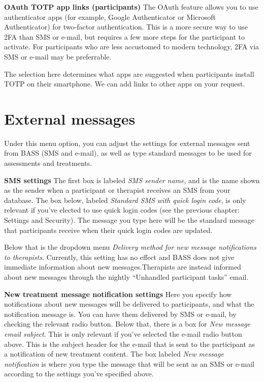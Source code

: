 \documentclass[
]{book}
\begin{document}
\textbf{OAuth TOTP app links (participants)}
The OAuth feature allows you to use authenticator apps (for example, Google Authenticator or Microsoft Authenticator) for two-factor authentication. This is a more secure way to use 2FA than SMS or e-mail, but requires a few more steps for the participant to activate. For participants who are less accustomed to modern technology, 2FA via SMS or e-mail may be preferrable.

The selection here determines what apps are suggested when participants install TOTP on their smartphone. We can add links to other apps on your request.

\chapter{External messages}\label{external-messages}

Under this menu option, you can adjust the settings for external messages sent from BASS (SMS and e-mail), as well as type standard messages to be used for assessments and treatments.

\textbf{SMS settings}
The first box is labeled \emph{SMS sender name}, and is the name shown as the sender when a participant or therapist receives an SMS from your database.
The box below, labeled \emph{Standard SMS with quick login code}, is only relevant if you've elected to use quick login codes (see the previous chapter: Settings and Security). The message you type here will be the standard message that participants receive when their quick login codes are updated.

Below that is the dropdown menu \emph{Delivery method for new message notifications to therapists}. Currently, this setting has no effect and BASS does not give immediate information about new messages.Therapists are instead informed about new messages through the nightly ``Unhandled participant tasks'' email.

\textbf{New treatment message notification settings}
Here you specify how notifications about new messages will be delivered to participants, and what the notification message is. You can have them delivered by SMS or e-mail, by checking the relevant radio button.
Below that, there is a box for \emph{New message email subject}. This is only relevant if you've selected the e-mail radio button above. This is the subject header for the e-mail that is sent to the participant as a notification of new treatment content.
The box labeled \emph{New message notification} is where you type the message that will be sent as an SMS or e-mail according to the settings you've specified above.
\end{document}
